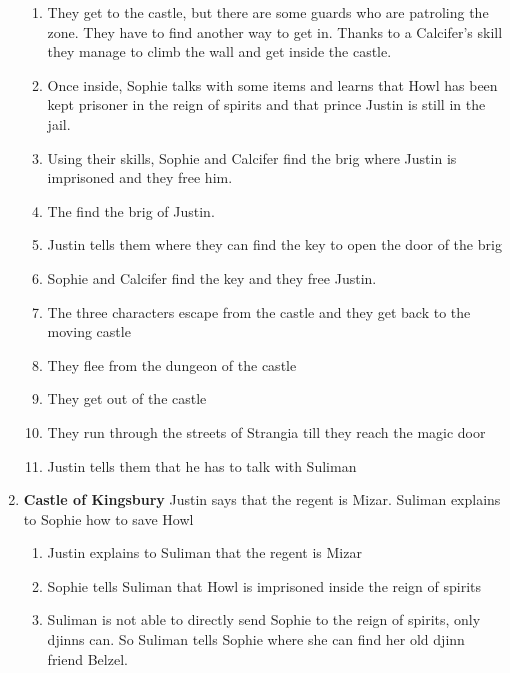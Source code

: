 \begin{enumerate}
\begin{enumerate}
  \item They get to the castle, but there are some guards who are patroling the zone. They have to find another way to get in. Thanks to a Calcifer’s skill they manage to climb the wall and get inside the castle.
    
  \item Once inside, Sophie talks with some items and learns that Howl has been kept prisoner in the reign of spirits and that prince Justin is still in the jail.
    
  \item Using their skills, Sophie and Calcifer find the brig where Justin is imprisoned and they free him.
    
  \item The find the brig of Justin.
    
  \item Justin tells them where they can find the key to open the door of the brig
    
  \item Sophie and Calcifer find the key and they free Justin.
    
  \item The three characters escape from the castle and they get back to the moving castle    
    
  \item They flee from the dungeon of the castle
    
  \item They get out of the castle
    
  \item They run through the streets of Strangia till they reach the magic door
    
  \item Justin tells them that he has to talk with Suliman
  \end{enumerate}

\item \textbf{Castle of Kingsbury} Justin says that the regent is Mizar. Suliman explains to Sophie how to save Howl

  \begin{enumerate}
  \item Justin explains to Suliman that the regent is Mizar
    
  \item Sophie tells Suliman that Howl is imprisoned inside the reign of spirits
    
  \item Suliman is not able to directly send Sophie to the reign of spirits, only djinns can. So Suliman tells Sophie where she can find her old djinn friend Belzel.
    

\end{enumerate}
\end{enumerate}
